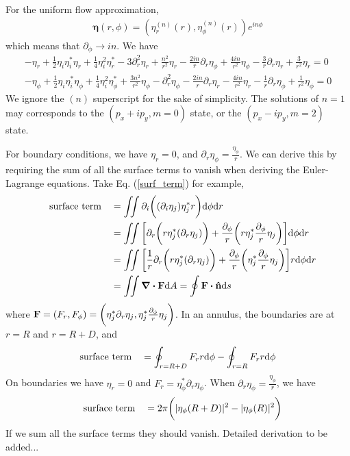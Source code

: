 \documentclass[aps,prl,preprint]{revtex4-2}
\begin{document}
For the uniform flow approximation,
\begin{align}
    \bm{\eta}(r, \phi) = \left(\eta_r^{(n)}(r), \eta_\phi^{(n)}(r)\right) e^{in\phi}
\end{align}
which means that $\partial_\phi \rightarrow in$. We have
\begin{align}
    -\eta_r+\frac{1}{2}\eta_i\eta_i^*\eta_r
    +\frac{1}{4}\eta_i^2\eta_r^*
    -3\partial_r^2\eta_r + \frac{n^2}{r^2}\eta_r
    -\frac{2in}{r}\partial_r\eta_\phi
    +\frac{4in}{r^2}\eta_\phi
    -\frac{3}{r}\partial_r\eta_r + \frac{3}{r^2}\eta_r=0 \nonumber \\
    -\eta_\phi+\frac{1}{2}\eta_i\eta_i^*\eta_\phi
    +\frac{1}{4}\eta_i^2\eta_\phi^*
    +\frac{3n^2}{r^2}\eta_\phi
    -\partial_r^2\eta_\phi
    -\frac{2in}{r}\partial_r\eta_r
    -\frac{4in}{r^2}\eta_r
    -\frac{1}{r}\partial_r\eta_\phi
    +\frac{1}{r^2}\eta_\phi=0\nonumber
\end{align}
We ignore the $(n)$ superscript for the sake of simplicity.
The solutions of $n=1$ may corresponds to the
$(p_x + ip_y, m=0)$ state, or the $(p_x - ip_y, m=2)$ state.

For boundary conditions, we have $\eta_r = 0$, and $\partial_r\eta_\phi = \frac{\eta_\phi}{r}$.
We can derive this by requiring the sum of all the surface terms to vanish
when deriving the Euler-Lagrange equations. Take Eq. (\ref{surf_term}) for example,
\begin{align}
    \qq{surface term}
     & = \iint\partial_i\bigg((\partial_i\eta_j)\eta_j^* r\bigg)\dd\phi\dd r                      \\
     & = \iint\bigg[\partial_r\bigg(r\eta_j^*(\partial_r\eta_j)\bigg)
    + \frac{\partial_\phi}{r}\bigg(r\eta_j^*\frac{\partial_\phi}{r}\eta_j\bigg)\bigg]\dd\phi\dd r \\
     & = \iint\bigg[\frac{1}{r}\partial_r\bigg(r\eta_j^*(\partial_r\eta_j)\bigg)
    + \frac{\partial_\phi}{r}\bigg(\eta_j^*\frac{\partial_\phi}{r}\eta_j\bigg)\bigg]r\dd\phi\dd r \\
     & =\iint\div\vb{F}\dd A  = \oint \vb{F} \vdot \vu{n} \dd s
\end{align}
where $\vb{F} = (F_r, F_\phi) = \bigg(\eta_j^*\partial_r\eta_j, \eta_j^*\frac{\partial_\phi}{r}\eta_j\bigg)$.
In an annulus, the boundaries are at $r=R$ and $r=R+D$, and
\begin{align}
    \qq{surface term}
     & = \oint_{r=R+D} F_r r\dd\phi-\oint_{r=R} F_r r\dd\phi
\end{align}
On boundaries we have $\eta_r=0$ and $F_r=\eta_\phi^*\partial_r\eta_\phi$.
When $\partial_r\eta_\phi = \frac{\eta_\phi}{r}$, we have
\begin{align}
    \qq{surface term} = 2\pi \bigg(|\eta_\phi(R+D)|^2 - |\eta_\phi(R)|^2\bigg)
\end{align}
If we sum all the surface terms they should vanish. Detailed derivation to be added...
\end{document}
